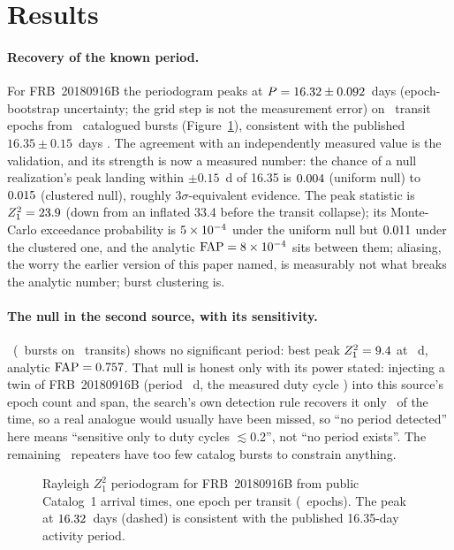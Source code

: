 \documentclass[twocolumn]{aastex631}
\begin{document}
\section{Results}
\paragraph{Recovery of the known period.} For FRB~20180916B the periodogram peaks at
$P=16.32\pm0.092$~days (epoch-bootstrap uncertainty; the grid step is not the
measurement error) on \fpNepochs\ transit epochs from \fpNbursts\ catalogued bursts
(Figure~\ref{fig:pgram}), consistent with the published $16.35\pm0.15$~days
\citep{chime2020periodic}. The agreement with an independently measured value is the
validation, and its strength is now a measured number: the chance of a null realization's peak
landing within $\pm0.15$~d of 16.35 is $0.004$ (uniform null) to $0.015$
(clustered null), roughly $3\sigma$-equivalent evidence. The peak statistic is
$Z^2_1=23.9$ (down from an inflated 33.4 before the transit collapse); its Monte-Carlo
exceedance probability is $5\times10^{-4}$ under the uniform null but $0.011$ under the
clustered one, and the analytic $\mathrm{FAP}=8\times10^{-4}$ sits between them; aliasing, the
worry the earlier version of this paper named, is measurably not what breaks the analytic
number; burst clustering is.

\paragraph{The null in the second source, with its sensitivity.} \fpNullName\ (\fpNullNbursts\
bursts on \fpNullNepochs\ transits) shows no significant period: best peak
$Z^2_1=9.4$ at \fpNullPeriod~d, analytic $\mathrm{FAP}=0.757$. That null is
honest only with its power stated: injecting a twin of FRB~20180916B (period \fpPeriod~d, the
measured duty cycle \fpDuty) into this source's epoch count and span, the search's own
detection rule recovers it only \fpTwinPower\ of the time, so a real analogue would usually
have been missed, so ``no period detected'' here means ``sensitive only to duty cycles
$\lesssim$0.2'', not ``no period exists''. The remaining \fpNunsearchable\ repeaters have too
few catalog bursts to constrain anything.

\begin{figure}
\caption{Rayleigh $Z^2_1$ periodogram for FRB~20180916B from public Catalog~1 arrival times,
one epoch per transit (\fpNepochs\ epochs). The peak at $16.32$~days (dashed) is
consistent with the published 16.35-day activity period.}
\label{fig:pgram}
\end{figure}
\end{document}
